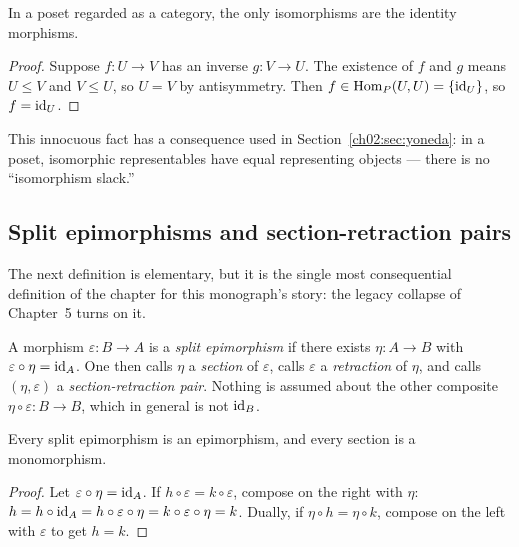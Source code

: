 \begin{proposition}\label{ch02:prop:poset-iso}
In a poset regarded as a category, the only isomorphisms are the
identity morphisms.
\end{proposition}

\begin{proof}
Suppose $f : U \to V$ has an inverse $g : V \to U$. The existence of $f$
and $g$ means $U \le V$ and $V \le U$, so $U = V$ by antisymmetry. Then
$f \in \mathrm{Hom}_P(U, U) = \{\mathrm{id}_U\}$, so $f = \mathrm{id}_U$.
\end{proof}

This innocuous fact has a consequence used in
Section~\ref{ch02:sec:yoneda}: in a poset, isomorphic representables have
equal representing objects --- there is no ``isomorphism slack.''

\subsection{Split epimorphisms and section-retraction pairs}\label{ch02:sec:split}

The next definition is elementary, but it is the single most consequential
definition of the chapter for this monograph's story: the legacy collapse
of Chapter~5 turns on it.

\begin{definition}\label{ch02:def:split}
A morphism $\varepsilon : B \to A$ is a \emph{split epimorphism} if there
exists $\eta : A \to B$ with $\varepsilon \circ \eta = \mathrm{id}_A$. One then
calls $\eta$ a \emph{section} of $\varepsilon$, calls $\varepsilon$ a
\emph{retraction} of $\eta$, and calls $(\eta, \varepsilon)$ a
\emph{section-retraction pair}. Nothing is assumed about the other
composite $\eta \circ \varepsilon : B \to B$, which in general is not
$\mathrm{id}_B$.
\end{definition}

\begin{proposition}\label{ch02:prop:split-epi-is-epi}
Every split epimorphism is an epimorphism, and every section is a
monomorphism.
\end{proposition}

\begin{proof}
Let $\varepsilon \circ \eta = \mathrm{id}_A$. If
$h \circ \varepsilon = k \circ \varepsilon$, compose on the right with
$\eta$: $h = h \circ \mathrm{id}_A = h \circ \varepsilon \circ \eta =
k \circ \varepsilon \circ \eta = k$. Dually, if
$\eta \circ h = \eta \circ k$, compose on the left with $\varepsilon$ to
get $h = k$.
\end{proof}

